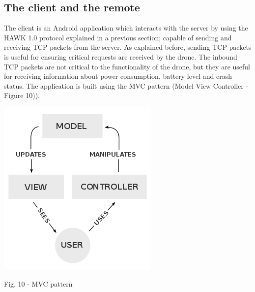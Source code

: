 \documentclass{IEEEtran}
\begin{document}
\subsection{\large{The client and the remote}}
The client is an Android application which interacts with the server by using the HAWK 1.0 protocol explained in a previous section; capable of sending and receiving TCP packets from the server. As explained before, sending TCP packets is useful for ensuring critical requests are received by the drone. The inbound TCP packets are not critical to the functionality of the drone, but they are useful for receiving information about power consumption, battery level and crash status.
\newline
\newline
The application is built using the MVC pattern (Model View Controller - Figure 10)).
\begin{center}\includegraphics[scale=.35]{mvc_pattern.png}\end{center} 
\begin{it}\begin{center}Fig. 10 - MVC pattern \end{center}\end{it}
\end{document}
